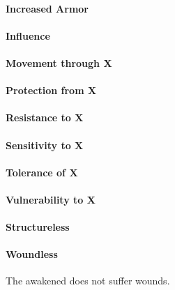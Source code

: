\paragraph{Increased Armor}



\paragraph{Influence}

\paragraph{Movement through X}



\paragraph{Protection from X}



\paragraph{Resistance to X}



\paragraph{Sensitivity to X}


\paragraph{Tolerance of X}


\paragraph{Vulnerability to X}



\paragraph{Structureless}


\paragraph{Woundless}

The awakened does not suffer wounds.
